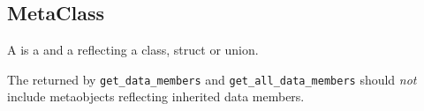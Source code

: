 \subsection{MetaClass}
\label{concept-MetaClass}

A  is a  and a 
reflecting a class, struct or union.





The  returned by \texttt{get\_data\_members} and
\texttt{get\_all\_data\_members} should \emph{not} include metaobjects reflecting
inherited data members.
